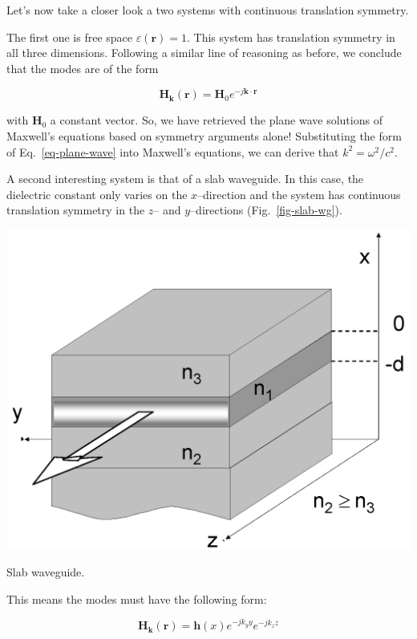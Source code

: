 Let's now take a closer look a two systems with continuous translation symmetry.

The first one is free space $\varepsilon({\mathbf r})=1$. This system has translation symmetry in all three dimensions. Following a similar line of reasoning as before, we conclude that the modes are of the form

\begin{equation}
{\mathbf H}_{\mathbf k}({\mathbf r}) = {\mathbf H}_0 e^{-j {\mathbf k} \cdot {\mathbf r}} \label{eq-plane-wave}
\end{equation} 

with ${\mathbf H}_0$ a constant vector. So, we have retrieved the plane wave solutions of Maxwell's equations based on symmetry arguments alone! Substituting the form of Eq.~\ref{eq-plane-wave} into Maxwell's equations, we can derive that $k^2 = \omega^2 / c^2$.


A second interesting system is that of a slab waveguide. In this case, the dielectric constant only varies on the $x$--direction and the system has continuous translation symmetry in the $z$-- and $y$--directions (Fig.~\ref{fig-slab-wg}). 

\begin{marginfigure}
\centering
\includegraphics{symmetry/figures/slabwg}
\caption{Slab waveguide.}
\label{fig-slab-wg}
\end{marginfigure}

This means the modes must have the following form:

\begin{equation}
{\mathbf H}_{\mathbf k}({\mathbf r}) = {\mathbf h}(x) e^{-j k_y y} e^{-j k_z z} 
\end{equation} 


